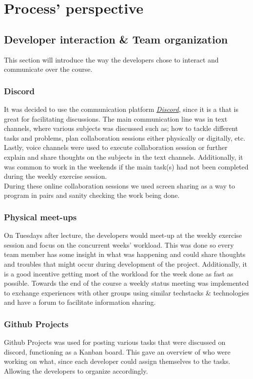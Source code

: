 \section{Process' perspective}
\subsection{Developer interaction \& Team organization}
This section will introduce the way the developers chose to interact and communicate over the course. 

\subsubsection{Discord}
It was decided to use the communication platform \href{https://discord.com/}{\textit{Discord}}, since it is a that is great for facilitating discussions. The main communication line was in text channels, where various subjects was discussed such as; how to tackle different tasks and problems, plan collaboration sessions either physically or digitally, etc. Lastly, voice channels were used to execute collaboration session or further explain and share thoughts on the subjects in the text channels. Additionally, it was common to work in the weekends if the main task(s) had not been completed during the weekly exercise session. \\
During these online collaboration sessions we used screen sharing as a way to program in pairs and sanity checking the work being done.

\subsubsection{Physical meet-ups}
On Tuesdays after lecture, the developers would meet-up at the weekly exercise session and focus on the concurrent weeks' workload. This was done so every team member has some insight in what was happening and could share thoughts and troubles that might occur during development of the project. Additionally, it is a good incentive getting most of the workload for the week done as fast as possible. Towards the end of the course a weekly status meeting was implemented to exchange experiences with other groups using similar techstacks \& technologies and have a forum to facilitate information sharing.

\subsubsection{Github Projects}
Github Projects was used for posting various tasks that were discussed on discord, functioning as a Kanban board. This gave an overview of who were working on what, since each developer could assign themselves to the tasks. Allowing the developers to organize accordingly.

